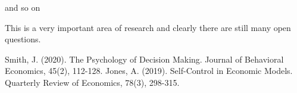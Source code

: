 \documentclass[12pt]{article}
\begin{document}
 

and so on



This is a very important area of research and clearly there are still many open questions.



\newpage

\begin{thebibliography}{9}
 Smith, J. (2020). The Psychology of Decision Making. Journal of Behavioral Economics, 45(2), 112-128.
 Jones, A. (2019). Self-Control in Economic Models. Quarterly Review of Economics, 78(3), 298-315.
\end{thebibliography}
\end{document}
